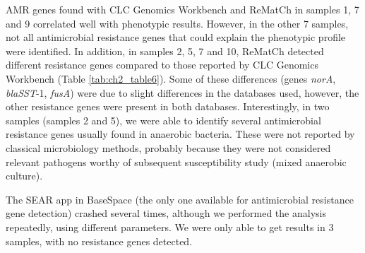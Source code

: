AMR genes found with CLC Genomics Workbench and ReMatCh in samples 1, 7 and 9 correlated well with phenotypic results. 
However, in the other 7 samples, not all antimicrobial resistance genes that could explain the phenotypic profile were identified. 
In addition, in samples 2, 5, 7 and 10, ReMatCh detected different resistance genes compared to those reported by CLC Genomics Workbench (Table \ref{tab:ch2_table6}).
Some of these differences (genes \textit{norA}, \textit{blaSST}-1, \textit{fusA}) were due to slight differences in the databases used, however, the other resistance genes were present in both databases. 
Interestingly, in two samples (samples 2 and 5), we were able to identify several antimicrobial resistance genes usually found in anaerobic bacteria. 
These were not reported by classical microbiology methods, probably because they were not considered relevant pathogens worthy of subsequent susceptibility study (mixed anaerobic culture).

The SEAR app in BaseSpace (the only one available for antimicrobial resistance gene detection) crashed several times, although we performed the analysis repeatedly, using different parameters.
We were only able to get results in 3 samples, with no resistance genes detected.

